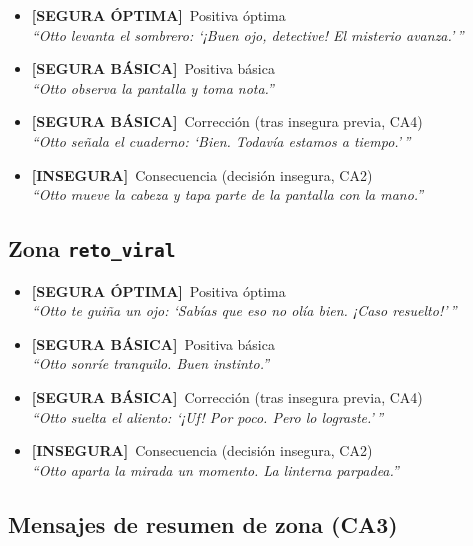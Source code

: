 \documentclass[12pt,a4paper]{article}
\newcommand{\segoptima}[1]{\item[\textcolor{segura}{$\bullet$}] \textcolor{segura}{\textbf{[SEGURA ÓPTIMA]}~#1}}
\newcommand{\segbasica}[1]{\item[\textcolor{basica}{$\bullet$}] \textcolor{basica}{\textbf{[SEGURA BÁSICA]}~#1}}
\newcommand{\inseg}[1]{\item[\textcolor{insegura}{$\bullet$}] \textcolor{insegura}{\textbf{[INSEGURA]}~#1}}
\begin{document}
\begin{itemize}[leftmargin=1.5cm]
  \segoptima{Positiva óptima}\\
  \textit{``Otto levanta el sombrero: `¡Buen ojo, detective! El misterio avanza.'\,''}

  \segbasica{Positiva básica}\\
  \textit{``Otto observa la pantalla y toma nota.''}

  \segbasica{Corrección (tras insegura previa, CA4)}\\
  \textit{``Otto señala el cuaderno: `Bien. Todavía estamos a tiempo.'\,''}

  \inseg{Consecuencia (decisión insegura, CA2)}\\
  \textit{``Otto mueve la cabeza y tapa parte de la pantalla con la mano.''}
\end{itemize}

\subsection{Zona \texttt{reto\_viral}}

\begin{itemize}[leftmargin=1.5cm]
  \segoptima{Positiva óptima}\\
  \textit{``Otto te guiña un ojo: `Sabías que eso no olía bien. ¡Caso resuelto!'\,''}

  \segbasica{Positiva básica}\\
  \textit{``Otto sonríe tranquilo. Buen instinto.''}

  \segbasica{Corrección (tras insegura previa, CA4)}\\
  \textit{``Otto suelta el aliento: `¡Uf! Por poco. Pero lo lograste.'\,''}

  \inseg{Consecuencia (decisión insegura, CA2)}\\
  \textit{``Otto aparta la mirada un momento. La linterna parpadea.''}
\end{itemize}

\subsection{Mensajes de resumen de zona (CA3)}
\end{document}
